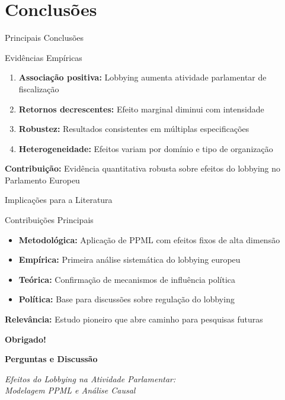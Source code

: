 \documentclass[aspectratio=169]{beamer}
\begin{document}

\section{Conclusões}

\begin{frame}{Principais Conclusões}
\begin{block}{Evidências Empíricas}
\begin{enumerate}
\item \textbf{Associação positiva:} Lobbying aumenta atividade parlamentar de fiscalização
\item \textbf{Retornos decrescentes:} Efeito marginal diminui com intensidade
\item \textbf{Robustez:} Resultados consistentes em múltiplas especificações
\item \textbf{Heterogeneidade:} Efeitos variam por domínio e tipo de organização
\end{enumerate}
\end{block}

\vspace{0.3cm}

\textbf{Contribuição:} Evidência quantitativa robusta sobre efeitos do lobbying no Parlamento Europeu
\end{frame}

\begin{frame}{Implicações para a Literatura}
\begin{block}{Contribuições Principais}
\begin{itemize}
\item \textbf{Metodológica:} Aplicação de PPML com efeitos fixos de alta dimensão
\item \textbf{Empírica:} Primeira análise sistemática do lobbying europeu
\item \textbf{Teórica:} Confirmação de mecanismos de influência política
\item \textbf{Política:} Base para discussões sobre regulação do lobbying
\end{itemize}
\end{block}

\vspace{0.3cm}

\textbf{Relevância:} Estudo pioneiro que abre caminho para pesquisas futuras
\end{frame}

\begin{frame}
\begin{center}
\Large \textbf{Obrigado!}

\vspace{1cm}
\textbf{Perguntas e Discussão}

\vspace{1cm}
\small
\textit{Efeitos do Lobbying na Atividade Parlamentar: \\ Modelagem PPML e Análise Causal}
\end{center}
\end{frame}
\end{document}
